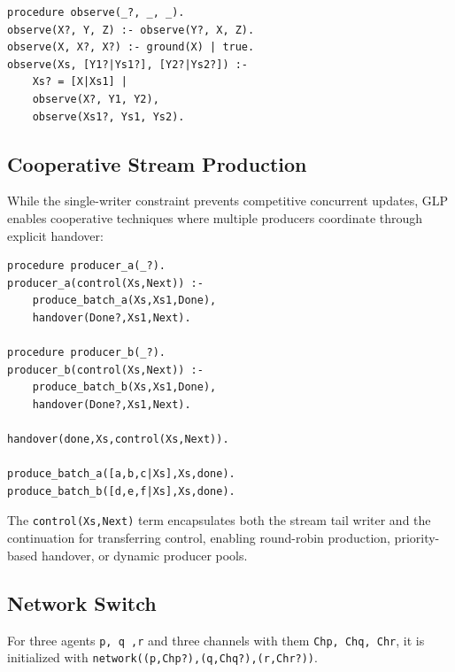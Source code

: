 \label{program:observer}
\begin{verbatim}
procedure observe(_?, _, _).
observe(X?, Y, Z) :- observe(Y?, X, Z).
observe(X, X?, X?) :- ground(X) | true.
observe(Xs, [Y1?|Ys1?], [Y2?|Ys2?]) :-
    Xs? = [X|Xs1] |
    observe(X?, Y1, Y2),
    observe(Xs1?, Ys1, Ys2).
\end{verbatim}

\subsection{Cooperative Stream Production}

While the single-writer constraint prevents competitive concurrent updates, GLP enables cooperative techniques where multiple producers coordinate through explicit handover:

\label{program:cooperative}
\begin{verbatim}
procedure producer_a(_?).
producer_a(control(Xs,Next)) :-
    produce_batch_a(Xs,Xs1,Done),
    handover(Done?,Xs1,Next).

procedure producer_b(_?).
producer_b(control(Xs,Next)) :-
    produce_batch_b(Xs,Xs1,Done),
    handover(Done?,Xs1,Next).

handover(done,Xs,control(Xs,Next)).

produce_batch_a([a,b,c|Xs],Xs,done).
produce_batch_b([d,e,f|Xs],Xs,done).
\end{verbatim}

The \verb|control(Xs,Next)| term encapsulates both the stream tail writer and the continuation for transferring control, enabling round-robin production, priority-based handover, or dynamic producer pools.

\subsection{Network Switch}

For three agents \verb|p, q ,r| and three channels  with them \verb|Chp, Chq, Chr|, it is initialized with 
\verb|network((p,Chp?),(q,Chq?),(r,Chr?))|.

